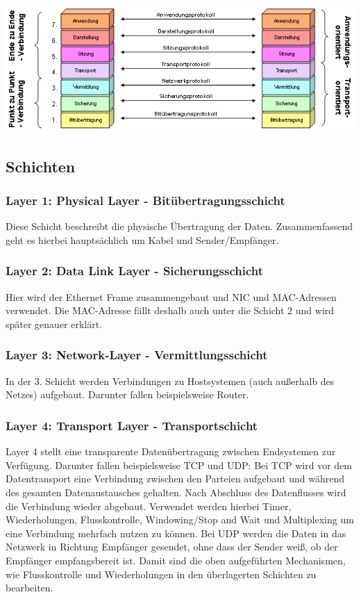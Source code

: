 \documentclass[12pt,a4paper]{article}
\begin{document}
			\includegraphics[scale=.75]{Bilder/OSI-Modell2} %

		\subsection{Schichten}
			\subsubsection{Layer 1: Physical Layer - Bitübertragungsschicht}
				Diese Schicht beschreibt die physische Übertragung der Daten. Zusammenfassend geht es hierbei hauptsächlich um Kabel und Sender/Empfänger.

			\subsubsection{Layer 2: Data Link Layer - Sicherungsschicht}
				Hier wird der Ethernet Frame zusammengebaut und NIC und MAC-Adressen verwendet. Die MAC-Adresse fällt deshalb auch unter die Schicht 2 und wird später genauer erklärt.

			\subsubsection{Layer 3: Network-Layer - Vermittlungsschicht}
				In der 3. Schicht werden Verbindungen zu Hostsystemen (auch außerhalb des Netzes) aufgebaut. Darunter fallen beispielsweise Router.

			\subsubsection{Layer 4: Transport Layer - Transportschicht}
				Layer 4 stellt eine transparente Datenübertragung zwischen Endsystemen zur Verfügung. Darunter fallen beispielsweise TCP und UDP:\newline\newline
				Bei TCP wird vor dem Datentransport eine Verbindung zwischen den Parteien aufgebaut und während des gesamten Datenaustausches gehalten. Nach Abschluss des Datenflusses wird die Verbindung wieder abgebaut. Verwendet werden hierbei Timer, Wiederholungen, Flusskontrolle, Windowing/Stop and Wait und Multiplexing um eine Verbindung mehrfach nutzen zu können.\newline\newline
				Bei UDP werden die Daten in das Netzwerk in Richtung Empfänger gesendet, ohne dass der Sender weiß, ob der Empfänger empfangsbereit ist. Damit sind die oben aufgeführten Mechanismen, wie Flusskontrolle und Wiederholungen in den überlagerten Schichten zu bearbeiten.
\end{document}
